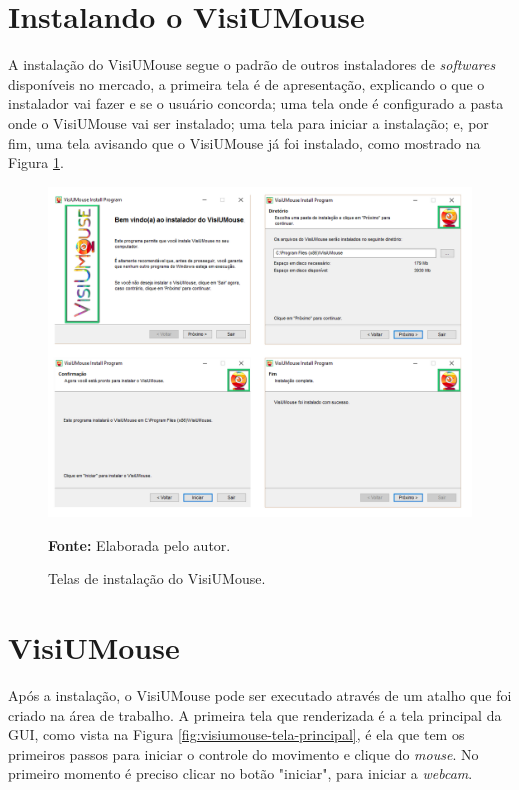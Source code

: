 \section{Instalando o VisiUMouse}
A instalação do VisiUMouse segue o padrão de outros instaladores de \textit{softwares} disponíveis no mercado, a primeira tela é de apresentação, explicando o que o instalador vai fazer e se o usuário concorda; uma tela onde é configurado a pasta onde o VisiUMouse vai ser instalado; uma tela para iniciar a instalação; e, por fim, uma tela avisando que o VisiUMouse já foi instalado, como mostrado na Figura \ref{fig:visiumouse-instalador}.

\begin{figure}[htbp]
\caption{Telas de instalação do VisiUMouse.} 
\centering \includegraphics[scale=0.45]{img/software-instalador.png}

\textbf{Fonte:} Elaborada pelo autor.
\label{fig:visiumouse-instalador}
\end{figure}

\section{VisiUMouse}
Após a instalação, o VisiUMouse pode ser executado através de um atalho que foi criado na área de trabalho. A primeira tela que renderizada é a tela principal da GUI, como vista na Figura \ref{fig:visiumouse-tela-principal}, é ela que tem os primeiros passos para iniciar o controle do movimento e clique do \textit{mouse}. No primeiro momento é preciso clicar no botão "iniciar", para iniciar a \textit{webcam}.


